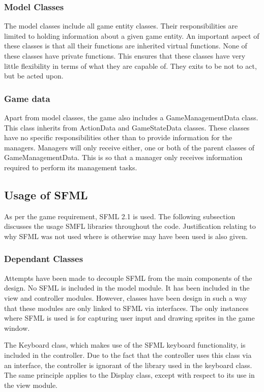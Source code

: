\documentclass[10pt,twocolumn]{witseiepaper}
\begin{document}
\subsubsection{Model Classes} The model classes include all game entity classes. Their responsibilities are limited to holding information about a given game entity. An important aspect of these classes is that all their functions are inherited virtual functions. None of these classes have private functions. This ensures that these classes have very little flexibility in terms of what they are capable of. They exits to be not to act, but be acted upon.

\subsubsection{Game data} Apart from model classes, the game also includes a GameManagementData class. This class inherits from ActionData and GameStateData classes. These classes have no specific responsibilities other than to provide information for the managers. Managers will only receive either, one or both of the parent classes of GameManagementData. This is so that a manager only receives information required to perform its management tasks.

\subsection{Usage of SFML} %
As per the game requirement, SFML 2.1 is used. The following subsection discusses the usage SMFL libraries throughout the code. Justification relating to why SFML was not used where is otherwise may have been used is also given.

\subsubsection{Dependant Classes}  Attempts have been made to decouple SFML from the main components of the design. No SFML is included in the model module. It has been included in the view and controller modules. However, classes have been design in such a way that these modules are only linked to SFML via interfaces. The only instances where SFML is used is for capturing user input and drawing sprites in the game window.

The Keyboard class, which makes use of the SFML keyboard functionality, is included in the controller. Due to the fact that the controller uses this class via an interface, the controller is ignorant of the library used in the keyboard class. The same principle applies to the Display class, except with respect to its use in the view module. 
\end{document}
